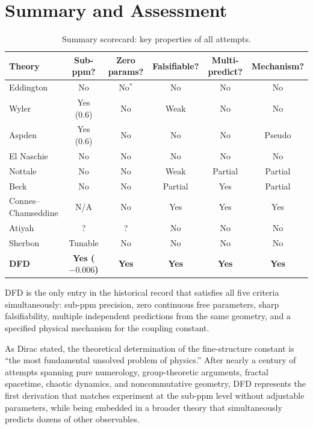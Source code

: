 \documentclass[11pt,a4paper]{article}
\begin{document}
\section{Summary and Assessment}

\begin{table}[h!]
\centering
\caption{Summary scorecard: key properties of all attempts.}\label{tab:scorecard}
\renewcommand{\arraystretch}{1.2}
\begin{tabular}{lccccc}
\toprule
\textbf{Theory} & \textbf{Sub-ppm?} & \textbf{Zero params?} & \textbf{Falsifiable?} & \textbf{Multi-predict?} & \textbf{Mechanism?} \\
\midrule
Eddington & No & No$^*$ & No & No & No \\
Wyler & Yes (0.6) & No & Weak & No & No \\
Aspden & Yes (0.6) & No & No & No & Pseudo \\
El Naschie & No & No & No & No & No \\
Nottale & No & No & Weak & Partial & Partial \\
Beck & No & No & Partial & Yes & Partial \\
Connes--Chamseddine & N/A & No & Yes & Yes & Yes \\
Atiyah & ? & ? & No & No & No \\
Sherbon & Tunable & No & No & No & No \\
\midrule
\rowcolor{green!10}
\textbf{DFD} & \textbf{Yes ($-0.006$)} & \textbf{Yes} & \textbf{Yes} & \textbf{Yes} & \textbf{Yes} \\
\bottomrule
\end{tabular}
\end{table}

\noindent
DFD is the only entry in the historical record that satisfies all five criteria simultaneously: sub-ppm precision, zero continuous free parameters, sharp falsifiability, multiple independent predictions from the same geometry, and a specified physical mechanism for the coupling constant.

As Dirac stated, the theoretical determination of the fine-structure constant is ``the most fundamental unsolved problem of physics.''  After nearly a century of attempts spanning pure numerology, group-theoretic arguments, fractal spacetime, chaotic dynamics, and noncommutative geometry, DFD represents the first derivation that matches experiment at the sub-ppm level without adjustable parameters, while being embedded in a broader theory that simultaneously predicts dozens of other observables.
\end{document}
